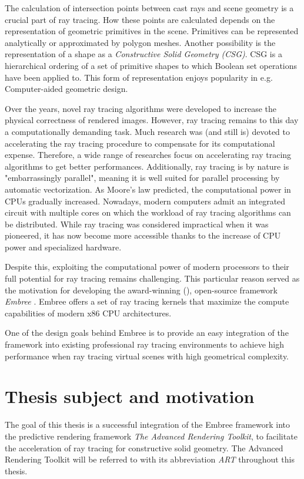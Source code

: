 The calculation of intersection points between cast rays and scene geometry is a crucial part of ray tracing. How these points are calculated depends on the representation of geometric primitives in the scene. Primitives can be represented analytically or approximated by polygon meshes. Another possibility is the representation of a shape as a \emph{Constructive Solid Geometry (CSG)}. CSG is a hierarchical ordering of a set of primitive shapes to which Boolean set operations have been applied to. This form of representation enjoys popularity in e.g. Computer-aided geometric design.

Over the years, novel ray tracing algorithms were developed to increase the physical correctness of rendered images. However, ray tracing remains to this day a computationally demanding task. Much research was (and still is) devoted to accelerating the ray tracing procedure to compensate for its computational expense. Therefore, a wide range of researches focus on accelerating ray tracing algorithms to get better performances. Additionally, ray tracing is by nature is "embarrassingly parallel", meaning it is well suited for parallel processing by automatic vectorization. As Moore’s law predicted, the computational power in CPUs gradually increased. Nowadays, modern computers admit an integrated circuit with multiple cores on which the workload of ray tracing algorithms can be distributed. While ray tracing was considered impractical when it was pioneered, it has now become more accessible thanks to the increase of CPU power and specialized hardware.

Despite this, exploiting the computational power of modern processors to their full potential for ray tracing remains challenging. This particular reason served as the motivation for developing the award-winning (\cite{embreeAward}), open-source framework \emph{Embree} \cite{wald2014embree}. Embree offers a set of ray tracing kernels that maximize the compute capabilities of modern x86 CPU architectures.

One of the design goals behind Embree is to provide an easy integration of the framework into existing professional ray tracing environments to achieve high performance when ray tracing virtual scenes with high geometrical complexity.


\section*{Thesis subject and motivation}
The goal of this thesis is a successful integration of the Embree framework into the predictive rendering framework \emph{The Advanced Rendering Toolkit}, to facilitate the acceleration of ray tracing for constructive solid geometry.
The Advanced Rendering Toolkit will be referred to with its abbreviation \emph{ART} throughout this thesis. 

